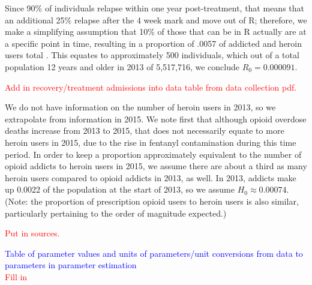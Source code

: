 \documentclass[12pt]{article}
\begin{document}
Since 90\% of individuals relapse within one year post-treatment, that means that an additional 25\% relapse after the 4 week mark and move out of R; therefore, we make a simplifying assumption that 10\% of those that can be in R actually are at a specific point in time, resulting in a proportion of .0057 of addicted and heroin users total \cite{Bailey}. This equates to approximately 500 individuals, which out of a total population 12 years and older in 2013 of 5,517,716, we conclude $R_0=0.000091.$

\textcolor{red}{Add in recovery/treatment admissions into data table from data collection pdf.}

We do not have information on the number of heroin users in 2013, so we extrapolate from information in 2015. We note first that although opioid overdose deaths increase from 2013 to 2015, that does not necessarily equate to more heroin users in 2015, due to the rise in fentanyl contamination during this time period. %
In order to keep a proportion approximately equivalent to the number of opioid addicts to heroin users in 2015, we assume there are about a third as many heroin users compared to opioid addicts in 2013, as well. In 2013, addicts make up 0.0022 of the population at the start of 2013, so we assume $H_0 \approx 0.00074.$ (Note: the proportion of prescription opioid users to heroin users is also similar, particularly pertaining to the order of magnitude expected.)

\textcolor{red}{Put in sources.}

\pagebreak
\textcolor{blue}{Table of parameter values and units of parameters/unit conversions from data to parameters in parameter estimation} \\
\textcolor{red}{Fill in}
\end{document}
